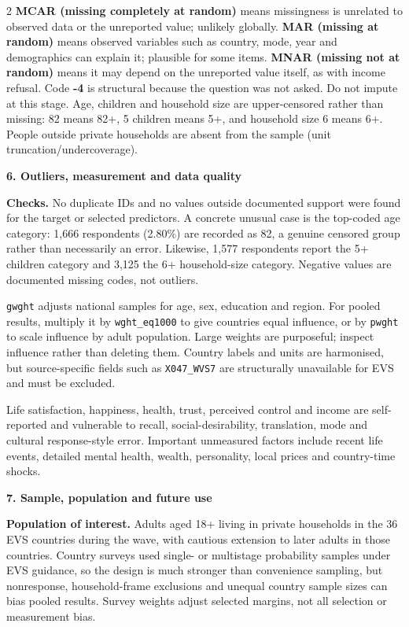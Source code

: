 \documentclass[10pt,a4paper]{article}
\newcommand{\ReportSection}[2]{%
  \vspace{3pt}%
  {\fontsize{9.5}{10.5}\selectfont\bfseries\color{Navy}#1. #2}\par
  \vspace{1pt}%
}
\begin{document}
\begin{multicols}{2}
\textbf{MCAR (missing completely at random)} means missingness is unrelated to observed data or the unreported value; unlikely globally. \textbf{MAR (missing at random)} means observed variables such as country, mode, year and demographics can explain it; plausible for some items. \textbf{MNAR (missing not at random)} means it may depend on the unreported value itself, as with income refusal. Code \textbf{-4} is structural because the question was not asked. Do not impute at this stage. Age, children and household size are upper-censored rather than missing: 82 means 82+, 5 children means 5+, and household size 6 means 6+. People outside private households are absent from the sample (unit truncation/undercoverage).

\ReportSection{6}{Outliers, measurement and data quality}
\textbf{Checks.} No duplicate IDs and no values outside documented support were found for the target or selected predictors. A concrete unusual case is the top-coded age category: 1,666 respondents (2.80\%) are recorded as 82, a genuine censored group rather than necessarily an error. Likewise, 1,577 respondents report the 5+ children category and 3,125 the 6+ household-size category. Negative values are documented missing codes, not outliers.

\texttt{gwght} adjusts national samples for age, sex, education and region. For pooled results, multiply it by \texttt{wght\_eq1000} to give countries equal influence, or by \texttt{pwght} to scale influence by adult population. Large weights are purposeful; inspect influence rather than deleting them. Country labels and units are harmonised, but source-specific fields such as \texttt{X047\_WVS7} are structurally unavailable for EVS and must be excluded.

Life satisfaction, happiness, health, trust, perceived control and income are self-reported and vulnerable to recall, social-desirability, translation, mode and cultural response-style error. Important unmeasured factors include recent life events, detailed mental health, wealth, personality, local prices and country-time shocks.

\ReportSection{7}{Sample, population and future use}
\textbf{Population of interest.} Adults aged 18+ living in private households in the 36 EVS countries during the wave, with cautious extension to later adults in those countries. Country surveys used single- or multistage probability samples under EVS guidance, so the design is much stronger than convenience sampling, but nonresponse, household-frame exclusions and unequal country sample sizes can bias pooled results. Survey weights adjust selected margins, not all selection or measurement bias.


\end{multicols}
\end{document}
